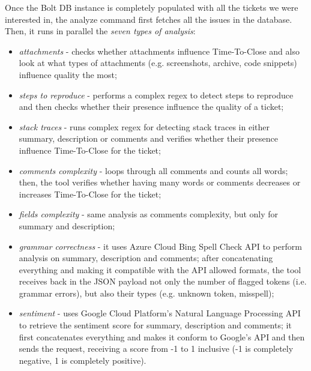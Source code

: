 \documentclass{mpaper}
\begin{document}
Once the Bolt DB instance is completely populated with all the tickets we were interested in, the analyze command first 
fetches all the issues in the database. Then, it runs in parallel the \emph{seven types of analysis}:
\begin{itemize}
  \item \emph{attachments} - checks whether attachments influence Time-To-Close and also look at what types 
  of attachments (e.g. screenshots, archive, code snippets) influence quality the most;
  \item \emph{steps to reproduce} - performs a complex regex to detect steps to reproduce and then checks whether their presence
  influence the quality of a ticket;
  \item \emph{stack traces} - runs complex regex for detecting stack traces in either summary, description or comments 
  and verifies whether their presence influence Time-To-Close for the ticket;
  \item \emph{comments complexity} - loops through all comments and counts all words; then, the tool verifies whether 
  having many words or comments decreases or increases Time-To-Close for the ticket;
  \item \emph{fields complexity} - same analysis as comments complexity, but only for summary and description;
  \item \emph{grammar correctness} - it uses Azure Cloud Bing Spell Check API \cite{bing} to perform analysis on summary, 
  description and comments; after concatenating everything and making it compatible with the API allowed formats, the tool 
  receives back in the JSON payload not only the number of flagged tokens (i.e. grammar errors), but also their types 
  (e.g. unknown token, misspell);
  \item \emph{sentiment} - uses Google Cloud Platform's Natural Language Processing API \cite{gcp_nlp} to retrieve the 
  sentiment score for summary, description and comments; it first concatenates everything and makes it conform to Google's 
  API and then sends the request, receiving a score from -1 to 1 inclusive (-1 is completely negative, 1 is completely 
  positive).
\end{itemize}
\end{document}
